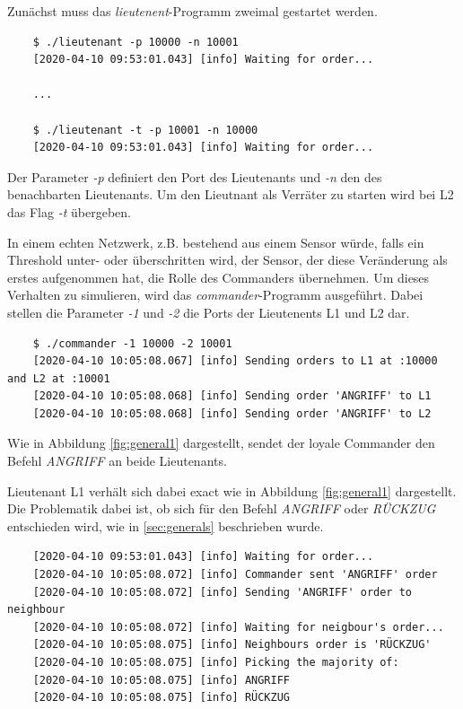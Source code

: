\documentclass{article}
\begin{document}
\medskip 

Zunächst muss das \textit{lieutenent}-Programm zweimal gestartet werden. 

\begin{center}
    \begin{verbatim}
    $ ./lieutenant -p 10000 -n 10001
    [2020-04-10 09:53:01.043] [info] Waiting for order...

    ...

    $ ./lieutenant -t -p 10001 -n 10000
    [2020-04-10 09:53:01.043] [info] Waiting for order...
    \end{verbatim}
\end{center}

Der Parameter \textit{-p} definiert den Port des Lieutenants und
\textit{-n} den des benachbarten Lieutenants. Um den Lieutnant als 
Verräter zu starten wird bei L2 das Flag \textit{-t} übergeben. 

\medskip 

In einem echten Netzwerk, z.B. bestehend aus einem Sensor würde, falls ein Threshold 
unter- oder überschritten wird, der Sensor, der diese Veränderung als erstes aufgenommen hat,
die Rolle des Commanders übernehmen. Um dieses Verhalten zu simulieren, wird das 
\textit{commander}-Programm ausgeführt. Dabei stellen die Parameter \textit{-1} und \textit{-2} die Ports
der Lieutenents L1 und L2 dar. 

\begin{center}
    \begin{verbatim}
    $ ./commander -1 10000 -2 10001
    [2020-04-10 10:05:08.067] [info] Sending orders to L1 at :10000 and L2 at :10001
    [2020-04-10 10:05:08.068] [info] Sending order 'ANGRIFF' to L1
    [2020-04-10 10:05:08.068] [info] Sending order 'ANGRIFF' to L2
    \end{verbatim}
\end{center}

Wie in Abbildung \ref{fig:general1} dargestellt, sendet der loyale Commander den Befehl 
\textit{ANGRIFF} an beide Lieutenants.

\medskip 

Lieutenant L1 verhält sich dabei exact wie in Abbildung \ref{fig:general1} dargestellt. 
Die Problematik dabei ist, ob sich für den Befehl \textit{ANGRIFF} oder \textit{RÜCKZUG} 
entschieden wird, wie in \ref{sec:generals} beschrieben wurde.

\begin{center}
    \begin{verbatim}
    [2020-04-10 09:53:01.043] [info] Waiting for order...
    [2020-04-10 10:05:08.072] [info] Commander sent 'ANGRIFF' order
    [2020-04-10 10:05:08.072] [info] Sending 'ANGRIFF' order to neighbour
    [2020-04-10 10:05:08.072] [info] Waiting for neigbour's order...
    [2020-04-10 10:05:08.075] [info] Neighbours order is 'RÜCKZUG'
    [2020-04-10 10:05:08.075] [info] Picking the majority of:
    [2020-04-10 10:05:08.075] [info] ANGRIFF
    [2020-04-10 10:05:08.075] [info] RÜCKZUG
    \end{verbatim}
\end{center}
\end{document}
